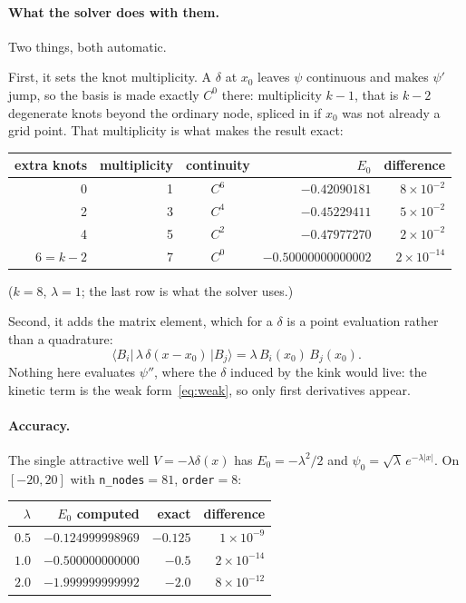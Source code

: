 \documentclass[11pt]{article}
\begin{document}
\paragraph{What the solver does with them.} Two things, both automatic.

First, it sets the knot multiplicity. A $\delta$ at $x_0$ leaves $\psi$
continuous and makes $\psi'$ jump, so the basis is made exactly $C^{0}$ there:
multiplicity $k-1$, that is $k-2$ degenerate knots beyond the ordinary node,
spliced in if $x_0$ was not already a grid point. That multiplicity is what
makes the result exact:

\begin{center}
\begin{tabular}{@{}rrcrr@{}}
\toprule
extra knots & multiplicity & continuity & $E_0$ & difference \\
\midrule
0           & 1 & $C^{6}$ & $-0.42090181$       & $8\times10^{-2}$ \\
2           & 3 & $C^{4}$ & $-0.45229411$       & $5\times10^{-2}$ \\
4           & 5 & $C^{2}$ & $-0.47977270$       & $2\times10^{-2}$ \\
$6 = k{-}2$ & 7 & $C^{0}$ & $-0.50000000000002$ & $2\times10^{-14}$ \\
\bottomrule
\end{tabular}
\end{center}

\noindent($k=8$, $\lambda=1$; the last row is what the solver uses.)

Second, it adds the matrix element, which for a $\delta$ is a point evaluation
rather than a quadrature:
\begin{equation}
  \langle B_i |\, \lambda\,\delta(x-x_0) \,| B_j \rangle
  = \lambda\,B_i(x_0)\,B_j(x_0).
\end{equation}
Nothing here evaluates $\psi''$, where the $\delta$ induced by the kink would
live: the kinetic term is the weak form~\eqref{eq:weak}, so only first
derivatives appear.

\paragraph{Accuracy.} The single attractive well $V = -\lambda\delta(x)$ has
$E_0 = -\lambda^{2}/2$ and $\psi_0 = \sqrt{\lambda}\,e^{-\lambda|x|}$. On
$[-20,20]$ with \texttt{n\_nodes}${}=81$, \texttt{order}${}=8$:

\begin{center}
\begin{tabular}{@{}rrrr@{}}
\toprule
$\lambda$ & $E_0$ computed & exact & difference \\
\midrule
$0.5$ & $-0.124999998969$ & $-0.125$ & $1\times10^{-9}$ \\
$1.0$ & $-0.500000000000$ & $-0.5$   & $2\times10^{-14}$ \\
$2.0$ & $-1.999999999992$ & $-2.0$   & $8\times10^{-12}$ \\
\bottomrule
\end{tabular}
\end{center}
\end{document}

